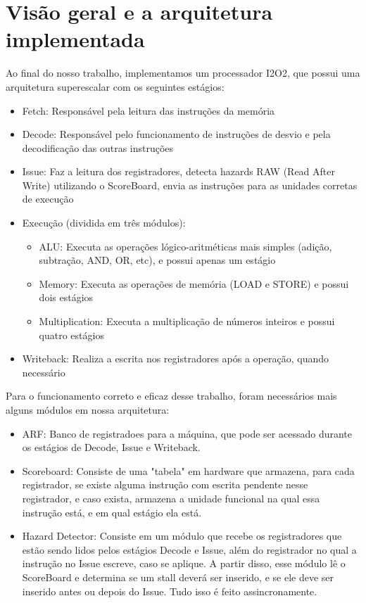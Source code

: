 \documentclass[12pt,a4paper]{article}
\numberwithin{equation}{section}
\begin{document}
\section {Visão geral e a arquitetura implementada}

Ao final do nosso trabalho, implementamos um processador I2O2, que possui uma arquitetura superescalar com os seguintes estágios:

\begin{itemize}
    \item Fetch: Responsável pela leitura das instruções da memória
    \item Decode: Responsável pelo funcionamento de instruções de desvio e pela decodificação das outras instruções
    \item Issue: Faz a leitura dos registradores, detecta hazards RAW (Read After Write) utilizando o ScoreBoard, envia as instruções para as unidades corretas de execução
    \item Execução (dividida em três módulos):
        \begin {itemize}
            \item ALU: Executa as operações lógico-aritméticas mais simples (adição, subtração, AND, OR, etc), e possui apenas um estágio
            \item Memory: Executa as operações de memória (LOAD e STORE) e possui dois estágios
            \item Multiplication: Executa a multiplicação de números inteiros e possui quatro estágios
        \end{itemize}
    \item Writeback: Realiza a escrita nos registradores após a operação, quando necessário
\end{itemize}

Para o funcionamento correto e eficaz desse trabalho, foram necessários mais alguns módulos em nossa arquitetura:

\begin{itemize}
    \item ARF: Banco de registradoes para a máquina, que pode ser acessado durante os estágios de Decode, Issue e Writeback.
    \item Scoreboard: Consiste de uma "tabela" em hardware que armazena, para cada registrador, se existe alguma instrução com escrita pendente nesse registrador, e caso exista, armazena a unidade funcional na qual essa instrução está, e em qual estágio ela está.
    \item Hazard Detector: Consiste em um módulo que recebe os registradores que estão sendo lidos pelos estágios Decode e Issue, além do registrador no qual a instrução no Issue escreve, caso se aplique. A partir disso, esse módulo lê o ScoreBoard e determina se um stall deverá ser inserido, e se ele deve ser inserido antes ou depois do Issue. Tudo isso é feito assincronamente.
\end{itemize}
\end{document}
